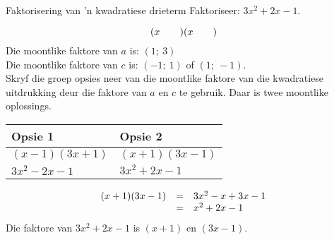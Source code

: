 \begin{wex}{Faktorisering van ’n kwadratiese drieterm}
{Faktoriseer: $3{x}^{2}+2x-1$.} 
{
\begin{equation*}
(x\phantom{\rule{2.em}{0ex}})(x\phantom{\rule{2.em}{0ex}})
\end{equation*}
Die moontlike faktore van $a$ is: $(1;~3)$\\
Die moontlike faktore van $c$ is: $(-1;~1)$ of $(1;~-1)$.\\
Skryf die groep opsies neer van die moontlike faktore van die kwadratiese uitdrukking deur die faktore van $a$ en $c$ te gebruik.
Daar is twee moontlike oplossings.\par 

\begin{table}[H]

\begin{center}


\begin{tabular}{|l|l|}\hline
\textbf{Opsie 1} &
\textbf{Opsie 2}%
\\ \hline
$(x-1)(3x+1)$
&
$(x+1)(3x-1)$
\\ \hline
$3{x}^{2}-2x-1$
&
\uline{
$3{x}^{2}+2x-1$
}
\\ \hline
\end{tabular}
\end{center}

\end{table}

\begin{equation*}
\begin{array}{ccl}  
(x+1)(3x-1)& =& 3{x}^{2}-x+3x-1\hfill \\ & =& {x}^{2}+2x-1\end{array}
\end{equation*}
Die faktore van $3{x}^{2}+2x-1$ is $(x+1)$ en $(3x-1)$.
}
\end{wex}


